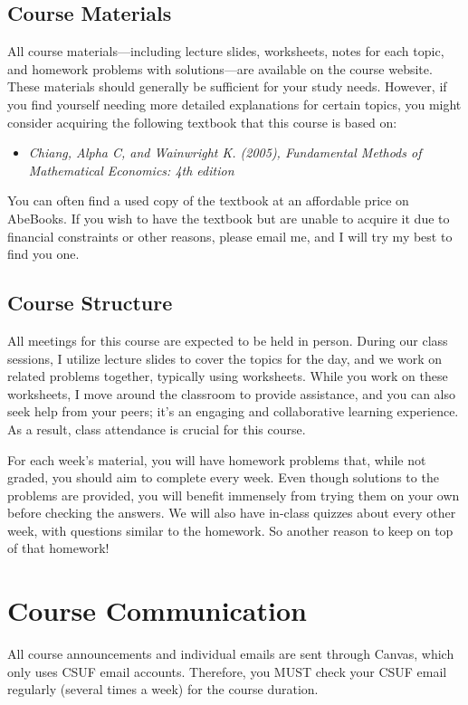 \documentclass{./../Latex/syllabus}
\begin{document}
\subsection*{Course Materials}

All course materials—including lecture slides, worksheets, notes for each topic, and homework problems with solutions—are available on the course website. These materials should generally be sufficient for your study needs. However, if you find yourself needing more detailed explanations for certain topics, you might consider acquiring the following textbook that this course is based on:

\begin{itemize}
  \item \textit{Chiang, Alpha C, and Wainwright K. (2005), Fundamental Methods of Mathematical Economics: 4th edition}
\end{itemize}

You can often find a used copy of the textbook at an affordable price on AbeBooks. If you wish to have the textbook but are unable to acquire it due to financial constraints or other reasons, please email me, and I will try my best to find you one.

\subsection*{Course Structure}

All meetings for this course are expected to be held in person. During our class sessions, I utilize lecture slides to cover the topics for the day, and we work on related problems together, typically using worksheets. While you work on these worksheets, I move around the classroom to provide assistance, and you can also seek help from your peers; it's an engaging and collaborative learning experience. As a result, class attendance is crucial for this course.

For each week's material, you will have homework problems that, while not graded, you should aim to complete every week. Even though solutions to the problems are provided, you will benefit immensely from trying them on your own before checking the answers. We will also have in-class quizzes about every other week, with questions similar to the homework. So another reason to keep on top of that homework!

\section*{Course Communication}
All course announcements and individual emails are sent through Canvas, which only uses CSUF email accounts. Therefore, you MUST check your CSUF email regularly (several times a week) for the course duration.
\end{document}
